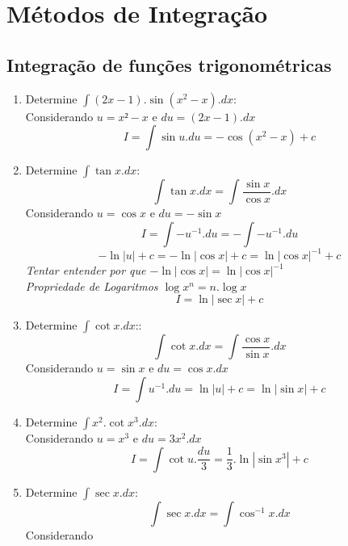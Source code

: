 \documentclass{article}
\begin{document}
	\section{Métodos de Integração}
		\subsection{Integração de funções trigonométricas}
			\begin{enumerate}
				\item Determine $\int (2x-1).\sin(x^2-x).dx$:\\
					Considerando $u = x²-x$ e $du = (2x-1).dx$
					$$I = \int \sin u . du=-\cos (x^2-x)+c$$
				\item Determine $\int \tan x.dx$:\\
					$$\int \tan x .dx = \int \dfrac{\sin x}{\cos x}.dx$$
					Considerando $u=\cos x$ e $du = -\sin x$
					$$I = \int -u^{-1}.du=-\int -u^{-1}.du $$
					$$-\ln |u|+c=-\ln |\cos x| +c=\ln |\cos x|^{-1}+c$$
					\textit{Tentar entender por que $-\ln |\cos x| = \ln |\cos x|^{-1}$}\\
					\textit{Propriedade de Logaritmos $\log x^n = n.\log x$}
					$$I = \ln |\sec x|+c$$
				\item Determine $\int \cot x.dx$::
					$$\int \cot x.dx = \int \dfrac{\cos x}{\sin x}.dx$$
					Considerando $u = \sin x$ e $du = \cos x.dx$
					$$I = \int u^{-1}.du=\ln |u|+c = \ln |\sin x| + c$$
				\item Determine $\int x^2.\cot x^3.dx$:\\
					Considerando $u = x^3$ e $du = 3x^2.dx$
					$$I = \int \cot u . \dfrac{du}{3}=\dfrac{1}{3}.\ln |\sin x^3| + c$$
				\item Determine $\int \sec x.dx$:\\
					$$\int \sec x.dx = \int \cos^{-1} x.dx$$
					Considerando
			\end{enumerate}
\end{document}
